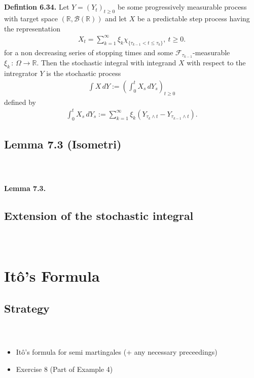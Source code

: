\documentclass{beamer}
\numberwithin{equation}{section}
\newenvironment{frame2}{\begin{frame}\frametitle{{\normalsize \secname} \\ {\large \subsecname}}}{\end{frame}}
\begin{document}
\begin{frame2}
    \begingroup
    \footnotesize
    \textbf{Defintion 6.34.}
    Let $Y = (Y_t)_{t\geq 0}$ be some progressively measurable process with target space $(\mathbb{R}, \mathcal{B}(\mathbb{R}))$ and let $X$ be a predictable step process having the representation
    \begin{align}
        X_t = \sum_{k = 1}^\infty \xi_k \chi_{\{\tau_{k - 1} < t \leq \tau_k\}}, \ t \geq 0.
    \end{align}
    for a non decreasing series of stopping times and some $\mathcal{F}_{\tau_{k-1}}$-measurable $\xi_k \, : \, \Omega \to \mathbb{R}$.
    Then the stochastic integral with integrand $X$ with respect to the intregrator $Y$ is the stochastic process
    \begin{align}
        \int X \, dY := \left(\int_0^t X_s \, d Y_s\right)_{t \geq 0}
    \end{align}
    defined by
    \begin{align}
        \int_0^t X_s \, dY_s := \sum_{k = 1}^\infty \xi_k \left(Y_{\tau_k \wedge t} - Y_{\tau_{k- 1} \wedge t}\right).
    \end{align}
    \endgroup
\end{frame2}

\subsection{Lemma 7.3 (Isometri)}

\begin{frame2}
    \textbf{Lemma 7.3.}
\end{frame2}

\subsection{Extension of the stochastic integral}

\begin{frame2}
    
\end{frame2}

\section{Itô's Formula}

\subsection{Strategy}
\begin{frame2}
    \begin{itemize}
        \item Itô's formula for semi martingales (+ any necessary preceedings)
        \item Exercise 8 (Part of Example 4)
    \end{itemize}
\end{frame2}
\end{document}
